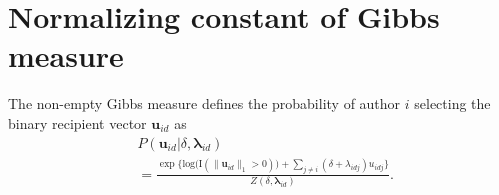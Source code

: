 \documentclass{article}
\begin{document}
\printAffiliationsAndNotice{\icmlEqualContribution} %

\section{Normalizing constant of Gibbs measure}\label{sec: non-empty Gibbs measure}
 	 The non-empty Gibbs measure defines the probability of author $i$ selecting the binary recipient vector $\boldsymbol{u}_{id}$ as
 	 \begin{equation*} 
 	 	\begin{aligned}
 	 		& P(\boldsymbol{u}_{id}| \delta, \boldsymbol{\lambda}_{id} ) \\&= \frac{\exp\Big\{ \mbox{log}\big(\text{I}(\lVert \boldsymbol{u}_{id} \rVert_1 > 0)\big) + \sum_{j \neq i} (\delta+\lambda_{idj})u_{idj} \Big\}}{Z(\delta,\boldsymbol{\lambda}_{id})}.
 	 	\end{aligned}
 	 \end{equation*}
 	 
\end{document}
